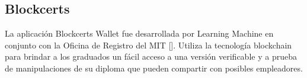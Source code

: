
\subsection{Blockcerts}


La aplicación Blockcerts Wallet fue desarrollada por Learning Machine en conjunto con la Oficina de Registro del MIT [\cite{81, 79}]. Utiliza la tecnología blockchain para brindar a los graduados un fácil acceso a una versión verificable y a prueba de manipulaciones de su diploma que pueden compartir con posibles empleadores. %





